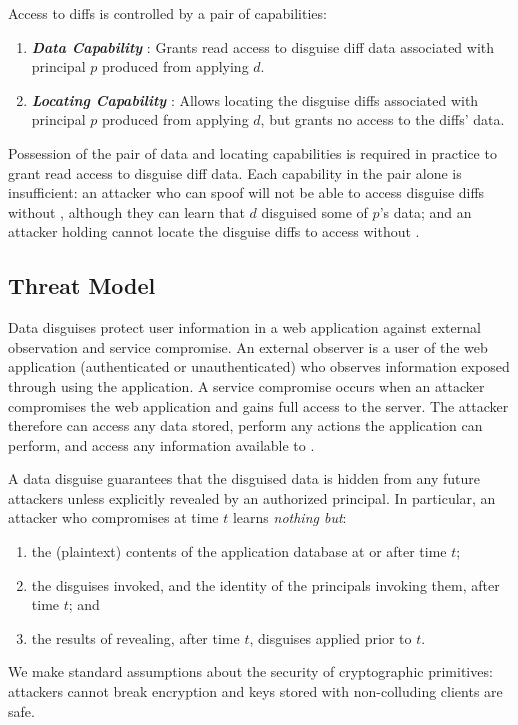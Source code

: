 Access to diffs is controlled by a pair of capabilities: 
\begin{enumerate}
    \item \emph{\textbf{Data Capability }}: Grants read access to disguise diff data
        associated with principal $p$ produced from applying $d$.
    \item \emph{\textbf{Locating Capability }}: Allows locating the disguise
        diffs associated with principal $p$ produced from applying $d$, but grants no 
        access to the diffs' data.
\end{enumerate}

\noindent Possession of the pair of data and locating capabilities  is required in
practice to grant read access to disguise diff data.  Each capability in the pair alone is
insufficient: an attacker who can spoof  will not be able to access disguise diffs without
, although they can learn that $d$ disguised some of $p$'s data; and an attacker holding
 cannot locate the disguise diffs to access without .

\subsection{Threat Model}
\label{s:threat}

%
Data disguises protect user information in a web application against external observation
and service compromise.
%
An external observer is a user of the web application (authenticated or unauthenticated) who
observes information exposed through using the application.
%
A service compromise occurs when an attacker compromises the web application and 
gains full access to the server.
%
The attacker therefore can access any data stored, perform any actions the application can
perform, and access any information available to \sys.
%

%
A data disguise guarantees that the disguised data is hidden from any future attackers unless
explicitly revealed by an authorized principal.
%
In particular, an attacker who compromises \sys at time $t$ learns \emph{nothing but}:
\begin{enumerate}[nosep]
  \item the (plaintext) contents of the application database at or after time $t$;
  \item the disguises invoked, and the identity of the principals invoking them, after time $t$; and
  \item the results of revealing, after time $t$, disguises applied prior to $t$.
\end{enumerate}
%
We make standard assumptions about the security of cryptographic primitives: attackers cannot
break encryption and keys stored with non-colluding clients are safe.
%

